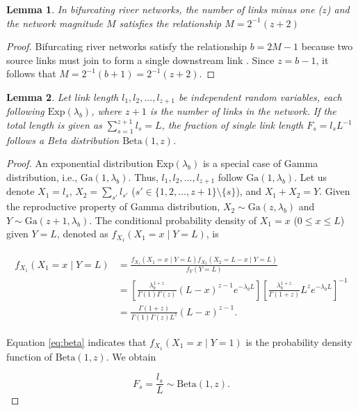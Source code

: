 \documentclass[11pt, class=article, crop=false]{standalone}
\newtheorem{lemma}{Lemma}[subsection]
\theoremstyle{definition}
\begin{document}
\begin{lemma}
\label{lemma-Mz}
In bifurcating river networks, the number of links minus one ($z$) and the network magnitude $M$ satisfies the relationship $M = 2^{-1}(z + 2)$
\end{lemma}

\begin{proof}
Bifurcating river networks satisfy the relationship $b = 2M - 1$ because two source links must join to form a single downstream link \cite{shreve_infinite_1967, rodriguez-iturbe_fractal_2001}.
Since $z = b - 1$, it follows that $M = 2^{-1}(b + 1) = 2^{-1}(z + 2)$.

\end{proof}

\begin{lemma}
\label{lemma-f}
Let link length $l_1, l_2, \ldots, l_{z+1}$ be independent random variables, each following $\mathrm{Exp}(\lambda_b)$, where $z+1$ is the number of links in the network.
If the total length is given as $\sum_{s=1}^{z+1} l_s = L$, the fraction of single link length $F_s = l_s L^{-1}$ follows a Beta distribution $\mathrm{Beta}(1, z)$.
\end{lemma}

\begin{proof}
An exponential distribution $\mathrm{Exp}(\lambda_b)$ is a special case of Gamma distribution, i.e., $\mathrm{Ga}(1, \lambda_b)$.
Thus, $l_1, l_2, \ldots, l_{z+1}$  follow $\mathrm{Ga}(1, \lambda_b)$.
Let us denote $X_1 = l_s$, $X_2 = \sum_{s'} l_{s'}$ ($s' \in \{1,2, \ldots, z+1\} \setminus \{s\}$), and $X_1 + X_2 = Y$.
Given the reproductive property of Gamma distribution, $X_2 \sim \mathrm{Ga}(z, \lambda_b)$ and $Y \sim \mathrm{Ga}(z + 1, \lambda_b)$.
The conditional probability density of $X_1 = x$ ($0 \le x \le L$) given $Y = L$, denoted as $f_{X_1}(X_1 = x\mid Y = L)$, is

\begin{align}
    \begin{split}
        f_{X_1}(X_1 = x\mid Y = L)
        &= \frac{f_{X_1}(X_1 = x\mid Y = L) f_{X_2}(X_2 = L - x\mid Y = L)}{f_Y(Y = L)}\\
        &= 
        \left[
        \frac{\lambda_b^{1 + z}}{\Gamma(1) \Gamma(z)} (L - x)^{z - 1} e^{-\lambda_b L}
        \right]
        \left[
        \frac{\lambda_b^{1 + z}}{\Gamma(1 + z)} L^{z} e^{-\lambda_b L}
        \right]^{-1}\\
        &= \frac{\Gamma(1 + z)}{\Gamma(1) \Gamma(z) L^{z}} (L - x)^{z - 1}.
    \end{split}
    \label{eq:beta}
\end{align}

Equation \ref{eq:beta} indicates that $f_{X_1}(X_1 = x\mid Y = 1)$ is the probability density function of $\mathrm{Beta}(1, z)$.
We obtain

\begin{equation}
    F_s=\frac{l_s}{L} \sim \mathrm{Beta} (1, z).
\end{equation}

\end{proof}
\end{document}
